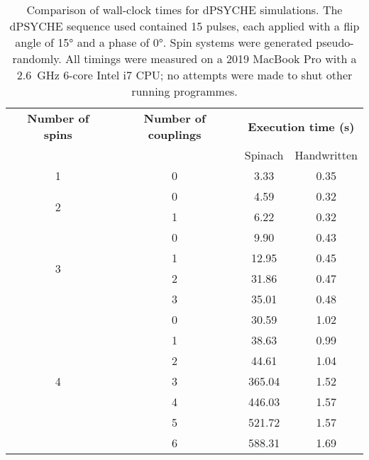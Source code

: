 \begin{table}[htb]
    \begin{tabular}{cccc}
        \toprule
        \textbf{Number of spins} & \textbf{Number of couplings} & \multicolumn{2}{c}{\textbf{Execution time (s)}} \\
        \cmidrule{3-4}
                                 & & Spinach & Handwritten \\
                                 \midrule
        \multirow{1}{*}{1}       & 0 & 3.33 & 0.35 \\
        \midrule
        \multirow{2}{*}{2}       & 0 & 4.59 & 0.32 \\
                                 & 1 & 6.22 & 0.32 \\
                                 \midrule
        \multirow{4}{*}{3}       & 0 & 9.90  & 0.43 \\
                                 & 1 & 12.95 & 0.45 \\
                                 & 2 & 31.86 & 0.47 \\
                                 & 3 & 35.01 & 0.48 \\
                                 \midrule
        \multirow{7}{*}{4}       & 0 & 30.59  & 1.02 \\
                                 & 1 & 38.63  & 0.99 \\
                                 & 2 & 44.61  & 1.04 \\
                                 & 3 & 365.04 & 1.52 \\
                                 & 4 & 446.03 & 1.57 \\
                                 & 5 & 521.72 & 1.57 \\
                                 & 6 & 588.31 & 1.69 \\
        \bottomrule
    \end{tabular}
    \caption[Comparison of wall-clock times for dPSYCHE simulations]{
        Comparison of wall-clock times for dPSYCHE simulations.
        The dPSYCHE sequence used contained 15 pulses, each applied with a flip angle of \ang{15} and a phase of \ang{0}.
        Spin systems were generated pseudo-randomly.
        All timings were measured on a 2019 MacBook Pro with a \SI{2.6}{\GHz} 6-core Intel i7 CPU; no attempts were made to shut other running programmes.
    }
    \label{tbl:dpsyche_simulations}
\end{table}

